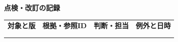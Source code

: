 \documentclass[11pt,a4paper]{article}
\begin{document}
\par{}\noindent\textbf{点検・改訂の記録}\par\vspace{1mm}
{\fontsize{8.5}{13}\selectfont
\begin{tabularx}{\linewidth}{@{}XXXX@{}}
\textbf{対象と版} & \textbf{根拠・参照ID} & \textbf{判断・担当} & \textbf{例外と日時}\\[2mm]
\strut & \strut & \strut & \strut\\[5mm]
\strut & \strut & \strut & \strut\\[5mm]
\end{tabularx}
}\vspace{2mm}\par
\end{document}
